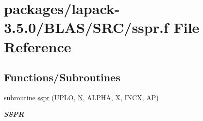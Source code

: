 \hypertarget{lapack-3_85_80_2BLAS_2SRC_2sspr_8f}{}\section{packages/lapack-\/3.5.0/\+B\+L\+A\+S/\+S\+R\+C/sspr.f File Reference}
\label{lapack-3_85_80_2BLAS_2SRC_2sspr_8f}
\subsection*{Functions/\+Subroutines}
\begin{DoxyCompactItemize}
\item 
subroutine \hyperlink{group__single__blas__level2_ga13dca9a765471c68248e8e00190f4d4d}{sspr} (U\+P\+L\+O, \hyperlink{polmisc_8c_a0240ac851181b84ac374872dc5434ee4}{N}, A\+L\+P\+H\+A, X, I\+N\+C\+X, A\+P)
\begin{DoxyCompactList}\small\item\em {\bfseries S\+S\+P\+R} \end{DoxyCompactList}\end{DoxyCompactItemize}
